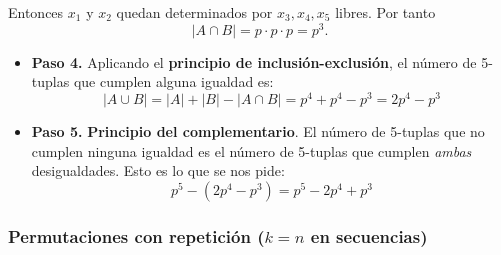 \documentclass[a4paper,12pt]{article}
\begin{document}
 \begin{ejercicio}[title=Ejercicio 29]
 Entonces $x_1$ y $x_2$ quedan determinados por $x_3,x_4,x_5$ libres. Por tanto
 \[
 |A\cap B|=p \cdot p \cdot p = p^3.
 \]
 \begin{itemize}
 \item[] \textbf{Paso 4.} Aplicando el \textbf{principio de inclusión-exclusión}, el número de 5-tuplas que cumplen alguna igualdad es:
 \[
 |A\cup B| = |A|+|B|-|A\cap B| = p^4+p^4-p^3 = 2p^4 - p^3
 \]
 \item[] \textbf{Paso 5.} \textbf{Principio del complementario}. El número de 5-tuplas que no cumplen ninguna igualdad es el número de 5-tuplas que cumplen \emph{ambas} desigualdades. Esto es lo que se nos pide:
 \[
 p^5 - (2p^4 - p^3) = \boxed{p^5 - 2p^4 + p^3}
 \]
\end{itemize}

\end{ejercicio}

\subsubsection{Permutaciones con repetición ($k=n$ en secuencias)}
\end{document}
